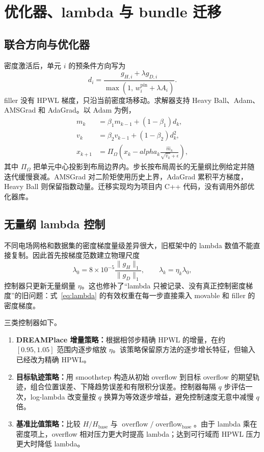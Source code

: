 \documentclass[UTF8,a4paper,11pt]{ctexart}
\newcommand{\OVF}{\operatorname{overflow}}
\begin{document}
\section{优化器、lambda 与 bundle 迁移}

\subsection{联合方向与优化器}

密度激活后，单元 \(i\) 的预条件方向写为
\begin{equation}
  d_i=\frac{g_{H,i}+\lambda g_{D,i}}
  {\max(1,\,w_i^{\mathrm{pin}}+\lambda A_i)}.
\end{equation}
filler 没有 HPWL 梯度，只沿当前密度场移动。求解器支持 Heavy Ball、Adam、AMSGrad 和 AdaGrad。以 Adam 为例，
\begin{align}
  m_k&=\beta_1m_{k-1}+(1-\beta_1)d_k,\\
  v_k&=\beta_2v_{k-1}+(1-\beta_2)d_k^2,\\
  x_{k+1}&=\Pi_\Omega\!\left(x_k-alpha_k
  \frac{\widehat m_k}{\sqrt{\widehat v_k}+\epsilon}\right),
\end{align}
其中 \(\Pi_\Omega\) 把单元中心投影到布局边界内。步长按布局周长的无量纲比例给定并随迭代缓慢衰减。AMSGrad 对二阶矩使用历史上界，AdaGrad 累积平方梯度，Heavy Ball 则保留指数动量。迁移实现均为项目内 C++ 代码，没有调用外部优化器库。

\subsection{无量纲 lambda 控制}

不同电场网格和数据集的密度梯度量级差异很大，旧框架中的 lambda 数值不能直接复制。因此首先按梯度范数建立物理尺度
\begin{equation}
  \lambda_0=8\times10^{-5}
  \frac{\lVert g_H\rVert_1}{\lVert g_D\rVert_1},
  \qquad \lambda_k=\eta_k\lambda_0,
  \label{eq:lambda}
\end{equation}
控制器只更新无量纲量 \(\eta\)。这也修补了“lambda 只被记录、没有真正控制密度梯度”的旧问题：式~\eqref{eq:lambda} 的有效权重在每一步直接乘入 movable 和 filler 的密度梯度。

三类控制器如下。

\begin{enumerate}
  \item \textbf{DREAMPlace 增量策略：}根据相邻步精确 HPWL 的增量，在约 \([0.95,1.05]\) 范围内逐步缩放 \(\eta\)。该策略保留原方法的逐步增长特征，但输入已经改为精确 HPWL。
  \item \textbf{目标轨迹策略：}用 smoothstep 构造从初始 overflow 到目标 overflow 的期望轨迹，组合位置误差、下降趋势误差和有限积分误差。控制器每隔 \(q\) 步评估一次，log-lambda 改变量按 \(q\) 换算为等效逐步增益，避免控制速度无意中减慢 \(q\) 倍。
  \item \textbf{基准比值策略：}比较 \(H/H_{\mathrm{base}}\) 与 \(\OVF/\OVF_{\mathrm{base}}\)。由于 lambda 乘在密度项上，overflow 相对压力更大时提高 lambda；达到可行域而 HPWL 压力更大时降低 lambda。
\end{enumerate}
\end{document}
